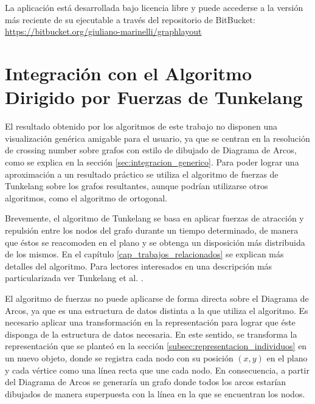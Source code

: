 \ \\
\ \\
La aplicación está  desarrollada bajo licencia libre y puede accederse a la versión más reciente de su ejecutable a través del repositorio de BitBucket:\\  \url{https://bitbucket.org/giuliano-marinelli/graphlayout}

\section{Integración con el Algoritmo Dirigido por Fuerzas de Tunkelang}
\label{sec:integracion_tunkelang}
El resultado obtenido por los algoritmos de este trabajo no disponen una visualización genérica amigable para el usuario, ya que se centran en la resolución de crossing number sobre grafos con estilo de dibujado de Diagrama de Arcos, como se explica en la sección \ref{sec:integracion_generico}. Para poder lograr una aproximación a un resultado práctico se utiliza el algoritmo de fuerzas de Tunkelang \cite{tunkelang1998jiggle} sobre los grafos resultantes, aunque podrían utilizarse otros algoritmos, como el algoritmo de  ortogonal. 

Brevemente, el algoritmo de Tunkelang se basa en aplicar fuerzas de atracción y repulsión entre los nodos del grafo durante un tiempo determinado, de manera que éstos se reacomoden en el plano y se obtenga un disposición más distribuida de los mismos. En el capítulo \ref{cap_trabajos_relacionados} se explican más detalles del algoritmo. Para lectores interesados en  una descripción más particularizada ver Tunkelang et al. \cite{tunkelang1998jiggle}.

El algoritmo de fuerzas no puede aplicarse de forma directa sobre el Diagrama de Arcos, ya que es una estructura de datos distinta a la que utiliza el algoritmo. Es necesario aplicar una transformación en la representación para lograr que éste disponga de la estructura de datos necesaria. En este sentido, se transforma la representación que se planteó en la sección \ref{subsec:representacion_individuos} en un nuevo objeto, donde se registra cada nodo con su posición $(x,y)$ en el plano y cada vértice como una línea recta que une cada nodo. En consecuencia, a partir del Diagrama de Arcos se generaría un grafo donde todos los arcos estarían dibujados de manera superpuesta con la línea en la que se encuentran los nodos.%

